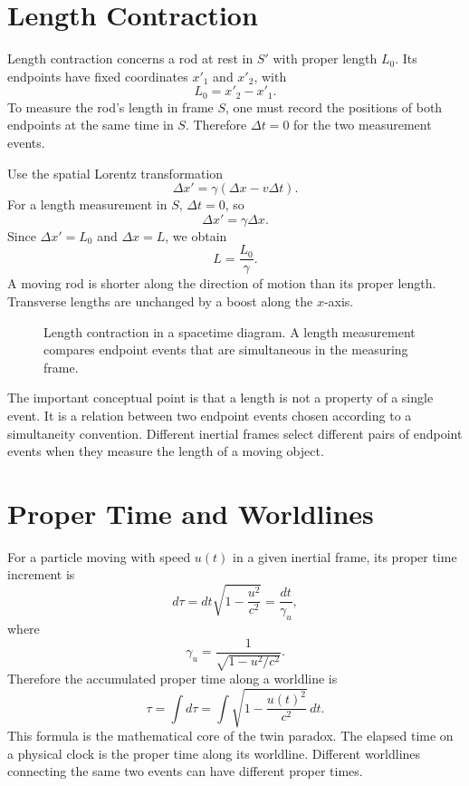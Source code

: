 \clearpage

\section{Length Contraction}

Length contraction concerns a rod at rest in \(S'\) with proper length \(L_0\).
Its endpoints have fixed coordinates \(x'_1\) and \(x'_2\), with
\[
L_0=x'_2-x'_1.
\]
To measure the rod's length in frame \(S\), one must record the positions of
both endpoints at the same time in \(S\). Therefore \(\Delta t=0\) for the two
measurement events.

Use the spatial Lorentz transformation
\[
\Delta x'=\gamma(\Delta x-v\Delta t).
\]
For a length measurement in \(S\), \(\Delta t=0\), so
\[
\Delta x'=\gamma\Delta x.
\]
Since \(\Delta x'=L_0\) and \(\Delta x=L\), we obtain
\[
\boxed{L=\frac{L_0}{\gamma}.}
\]
A moving rod is shorter along the direction of motion than its proper length.
Transverse lengths are unchanged by a boost along the \(x\)-axis.

\begin{figure}[h]
\centering

\caption{Length contraction in a spacetime diagram. A length measurement compares
endpoint events that are simultaneous in the measuring frame.}
\end{figure}

The important conceptual point is that a length is not a property of a single
event. It is a relation between two endpoint events chosen according to a
simultaneity convention. Different inertial frames select different pairs of
endpoint events when they measure the length of a moving object.

\clearpage

\section{Proper Time and Worldlines}

For a particle moving with speed \(u(t)\) in a given inertial frame, its proper
time increment is
\[
d\tau=dt\sqrt{1-\frac{u^2}{c^2}}=\frac{dt}{\gamma_u},
\]
where
\[
\gamma_u=\frac{1}{\sqrt{1-u^2/c^2}}.
\]
Therefore the accumulated proper time along a worldline is
\[
\tau=\int d\tau=\int \sqrt{1-\frac{u(t)^2}{c^2}}\,dt.
\]
This formula is the mathematical core of the twin paradox. The elapsed time on a
physical clock is the proper time along its worldline. Different worldlines
connecting the same two events can have different proper times.

